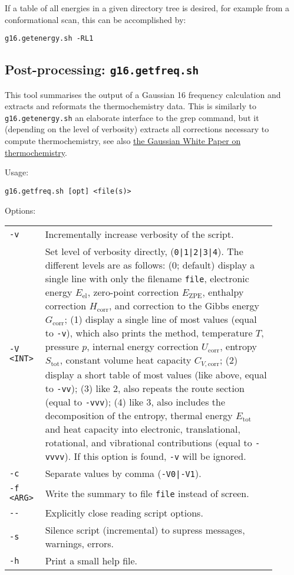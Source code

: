 \documentclass[   %
  final,          %
  a4paper         %
]{article}
\begin{document}
If a table of all energies in a given directory tree is desired, 
for example from a conformational scan, this can be accomplished by:

\lstinline`g16.getenergy.sh -RL1`

\subsection{Post-processing: \texorpdfstring{{\lstinline`g16.getfreq.sh`}}{g16.getfreq.sh}}
\label{sec:g16.getfreq}

This tool summarises the output of a Gaussian 16 frequency calculation 
and extracts and reformats the thermochemistry data.
This is similarly to \lstinline`g16.getenergy.sh` an elaborate interface to the grep command,
but it (depending on the level of verbosity) extracts all corrections necessary 
to compute thermochemistry, see also 
\href{http://gaussian.com/thermo/}{the Gaussian White Paper on thermochemistry}.

Usage: 

\lstinline`g16.getfreq.sh [opt] <file(s)>`

Options:

\begin{tabular}{p{0.1\linewidth}p{0.8\linewidth}}
  {\lstinline`-v`}       & Incrementally increase verbosity of the script. \\
  {\lstinline`-V <INT>`} & Set level of verbosity directly, ({\lstinline`0|1|2|3|4`}).
    The different levels are as follows: %
    (0; default) display a single line with only the filename {\lstinline`file`}, 
        electronic energy \(E_\mathrm{el}\), zero-point correction \(E_\mathrm{ZPE}\),
        enthalpy correction \(H_\mathrm{corr}\), 
        and correction to the Gibbs energy \(G_\mathrm{corr}\);
    (1) display a single line of most values (equal to {\lstinline`-v`}), 
        which also prints the method, temperature \(T\), pressure \(p\), 
        internal energy correction \(U_\mathrm{corr}\),
        entropy  \(S_\mathrm{tot}\), constant volume heat capacity \(C_{V,\mathrm{corr}}\);
    (2) display a short table of most values (like above, equal to {\lstinline`-vv`});
    (3) like 2, also repeats the route section (equal to {\lstinline`-vvv`});
    (4) like 3, also includes the decomposition of the entropy, 
        thermal energy \(E_\mathrm{tot}\) and heat capacity into electronic, translational,
        rotational, and vibrational contributions (equal to {\lstinline`-vvvv`}).
    If this option is found, {\lstinline`-v`} will be ignored. \\
  {\lstinline`-c`}       & Separate values by comma ({\lstinline`-V0|-V1`}). \\
  {\lstinline`-f <ARG>`} & Write the summary to file {\lstinline`file`} instead of screen. \\
  {\lstinline`--`}       & Explicitly close reading script options. \\
  {\lstinline`-s`}       & Silence script (incremental) to supress messages, warnings, errors. \\
  {\lstinline`-h`}       & Print a small help file. \\
\end{tabular}
\end{document}
